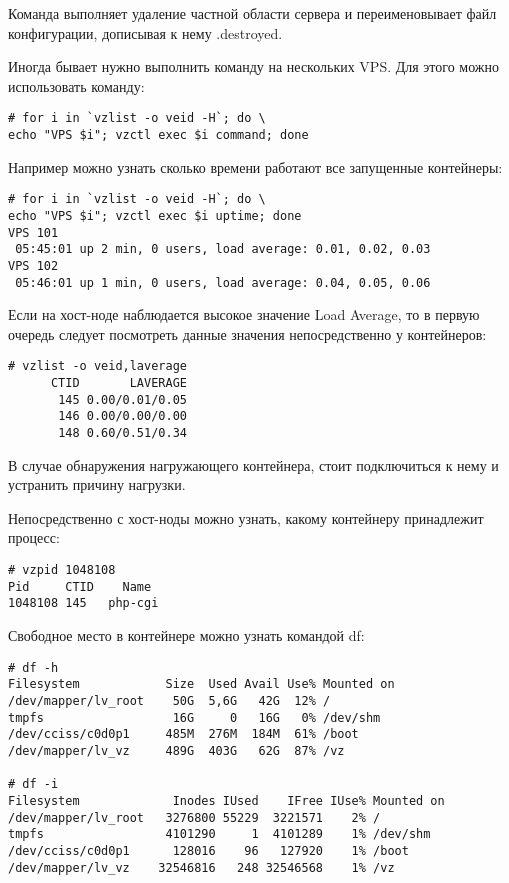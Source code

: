 Команда выполняет удаление частной области сервера и переименовывает файл конфигурации, дописывая к нему .destroyed.

Иногда бывает нужно выполнить команду на нескольких VPS.
Для этого можно использовать команду:
\begin{lstlisting}
# for i in `vzlist -o veid -H`; do \
echo "VPS $i"; vzctl exec $i command; done
\end{lstlisting}

Например можно узнать сколько времени работают все запущенные контейнеры:
\begin{lstlisting}
# for i in `vzlist -o veid -H`; do \
echo "VPS $i"; vzctl exec $i uptime; done
VPS 101
 05:45:01 up 2 min, 0 users, load average: 0.01, 0.02, 0.03
VPS 102
 05:46:01 up 1 min, 0 users, load average: 0.04, 0.05, 0.06
\end{lstlisting}

Если на хост-ноде наблюдается высокое значение Load Average, то в первую очередь следует посмотреть данные значения непосредственно у контейнеров:
\begin{lstlisting}
# vzlist -o veid,laverage
      CTID       LAVERAGE
       145 0.00/0.01/0.05
       146 0.00/0.00/0.00
       148 0.60/0.51/0.34
\end{lstlisting}

В случае обнаружения нагружающего контейнера, стоит подключиться к нему и устранить причину нагрузки.

Непосредственно с хост-ноды можно узнать, какому контейнеру принадлежит процесс:
\begin{lstlisting}
# vzpid 1048108
Pid	    CTID	Name
1048108	145	  php-cgi
\end{lstlisting}

Свободное место в контейнере можно узнать командой df:
\begin{lstlisting}
# df -h
Filesystem            Size  Used Avail Use% Mounted on
/dev/mapper/lv_root    50G  5,6G   42G  12% /
tmpfs                  16G     0   16G   0% /dev/shm
/dev/cciss/c0d0p1     485M  276M  184M  61% /boot
/dev/mapper/lv_vz     489G  403G   62G  87% /vz

# df -i
Filesystem             Inodes IUsed    IFree IUse% Mounted on
/dev/mapper/lv_root   3276800 55229  3221571    2% /
tmpfs                 4101290     1  4101289    1% /dev/shm
/dev/cciss/c0d0p1      128016    96   127920    1% /boot
/dev/mapper/lv_vz    32546816   248 32546568    1% /vz
\end{lstlisting}


